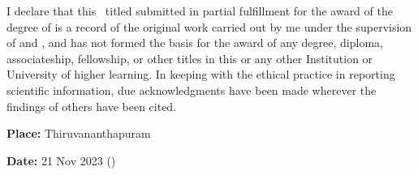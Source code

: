 \begin{ThesisDeclaration}

\noindent I declare that this \Doctype \ titled \textbf{\textit{\Title}} submitted in partial fulfillment for the award of the degree of
{\bf\Degreetext} is a record of the original work carried out by me
under the supervision of \textbf{\FirstAdvisor} and \textbf{\SecondAdvisor}, and has not formed the basis for the award of any degree, diploma, associateship, fellowship, or other titles in this or any other Institution or University of higher learning. In keeping with the ethical practice in reporting scientific information, due acknowledgments have been made wherever the findings of others have been cited.

\vspace{35mm}

\noindent\textbf{Place: }Thiruvananthapuram \hfill \Author \hspace{2mm} 

\noindent\textbf{Date: }21 Nov 2023  \hfill (\Studentid) \hspace{7mm}

\end{ThesisDeclaration}